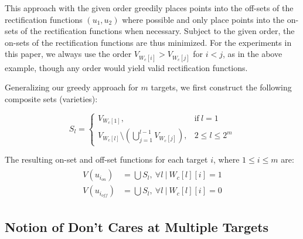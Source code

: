 This approach with the given order greedily places points into the off-sets of the rectification functions $(u_1, u_2)$
 where possible and only place points into the on-sets of the rectification functions when necessary. 
Subject to the given order, the on-sets of the rectification functions are thus minimized. For the experiments in this paper, 
we always use the order
$V_{W_c[i]} > V_{W_c[j]}$ for $i < j$, as in the above example, though any order would yield valid rectification functions. 

Generalizing our greedy approach for $m$ targets, we first
construct the following composite sets (varieties):

\begin{equation}
  \label{eqn:composite_greedy}
  S_l=
  \begin{cases}
    V_{W_c[1]},                                                & \text{if}\ l=1   \\
    V_{W_c[l]} \setminus (\bigcup\limits_{j=1}^{l-1}V_{W_c[j]}), & 2\leq l \leq 2^m
  \end{cases}
\end{equation}

The resulting on-set and off-set functions for each target $i$, where $1 \leq i \leq m$ are: 
\begin{align}
  \label{eqn:ui_on_off}
  \begin{split}
  V(u_{i_{on}}) &= \bigcup S_l,~\forall l~|~W_c[l][i]=1 \\
  V(u_{i_{off}}) &= \bigcup S_l,~\forall l~|~W_c[l][i]=0
  \end{split}
\end{align}





\subsection{Notion of Don't Cares at Multiple Targets}\label{comp:DFC1}

